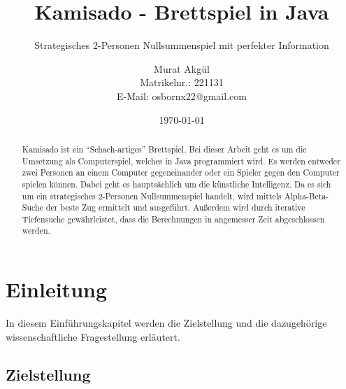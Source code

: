 \documentclass[
	12pt,
	halfparskip,
	a4paper,
	abstract,
	bibliography=totoc,
	liststotoc
]{scrreprt}
\begin{document}



\graphicspath{{bilder/}}

\titlehead{Technische Universität Berlin
	\\ Fakultät Elektrotechnik und Informatik
	\\ Institut für Softwaretechnik und Theoretische Informatik
	\\ Fachgebiet Künstliche Intelligenz
}
\subject{Proposal zur Bachelorarbeit}
\title{Kamisado - Brettspiel in Java}
\subtitle{Strategisches 2-Personen Nullsummenspiel mit perfekter Information}
\author{Murat Akgül
	\\ Matrikelnr.: 221131
	\\ E-Mail: osbornx22@gmail.com}
\date{\today}
\publishers{Betreut von Dr.- Ing. Stefan Fricke
	\\ E-Mail: stefan.fricke@dai-labor.de}

\maketitle

\begin{abstract}

Kamisado ist ein “Schach-artiges” Brettspiel. Bei dieser Arbeit geht es um die Umsetzung als Computerspiel, welches in Java programmiert wird. Es werden entweder zwei Personen an einem Computer gegeneinander oder ein Spieler gegen den Computer spielen können. Dabei geht es hauptsächlich um die künstliche Intelligenz. Da es sich um ein strategisches 2-Personen Nullsummenspiel handelt, wird mittels Alpha-Beta-Suche der beste Zug ermittelt und ausgeführt. Außerdem wird durch iterative Tiefensuche gewährleistet, dass die Berechnungen in angemesser Zeit abgeschlossen werden.

\end{abstract}

\tableofcontents

\chapter{Einleitung}

In diesem Einführungskapitel werden die Zielstellung und die dazugehörige wissenschaftliche Fragestellung erläutert.

\section{Zielstellung}
\end{document}
